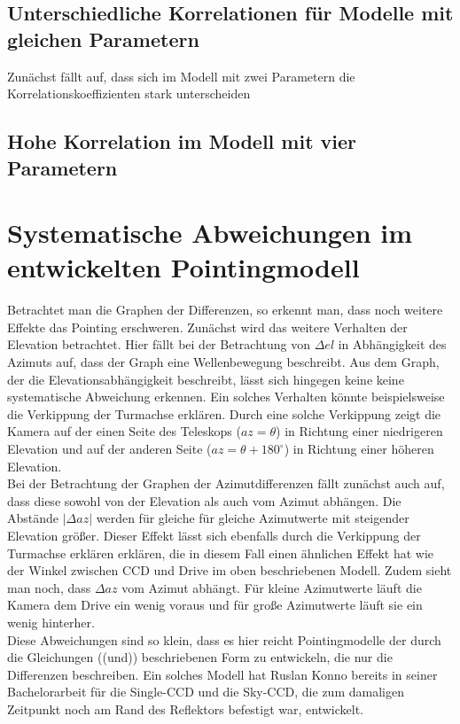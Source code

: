 \subsection{Unterschiedliche Korrelationen für Modelle mit gleichen Parametern}
Zunächst fällt auf, dass sich im Modell mit zwei Parametern die Korrelationskoeffizienten stark unterscheiden
\subsection{Hohe Korrelation im Modell mit vier Parametern}

\section{Systematische Abweichungen im entwickelten Pointingmodell}
Betrachtet man die Graphen der Differenzen, so erkennt man, dass noch weitere Effekte das Pointing erschweren. Zunächst wird das weitere Verhalten der Elevation betrachtet. Hier fällt bei der Betrachtung von $\Delta el$ in Abhängigkeit des Azimuts auf, dass der Graph eine Wellenbewegung beschreibt. Aus dem Graph, der die Elevationsabhängigkeit beschreibt, lässt sich hingegen keine keine systematische Abweichung erkennen. Ein solches Verhalten könnte beispielsweise die Verkippung der Turmachse erklären. Durch eine solche Verkippung zeigt die Kamera auf der einen Seite des Teleskops ($az=\theta$) in Richtung einer niedrigeren Elevation und auf der anderen Seite ($az=\theta+180^{\circ}$) in Richtung einer höheren Elevation.\\
Bei der Betrachtung der Graphen der Azimutdifferenzen fällt zunächst auch auf, dass diese sowohl von der Elevation als auch vom Azimut abhängen. Die Abstände $\left| \Delta az \right|$ werden für gleiche für gleiche Azimutwerte mit steigender Elevation größer. Dieser Effekt lässt sich ebenfalls durch die Verkippung der Turmachse erklären erklären, die in diesem Fall einen ähnlichen Effekt hat wie der Winkel zwischen CCD und Drive im oben beschriebenen Modell. Zudem sieht man noch, dass $\Delta az$ vom Azimut abhängt. Für kleine Azimutwerte läuft die Kamera dem Drive ein wenig voraus und für große Azimutwerte läuft sie ein wenig hinterher.\\
Diese Abweichungen sind so klein, dass es hier reicht Pointingmodelle der durch die Gleichungen ((und)) beschriebenen Form zu entwickeln, die nur die Differenzen beschreiben. Ein solches Modell hat Ruslan Konno bereits in seiner Bachelorarbeit für die Single-CCD und die Sky-CCD, die zum damaligen Zeitpunkt noch am Rand des Reflektors befestigt war, entwickelt. 

